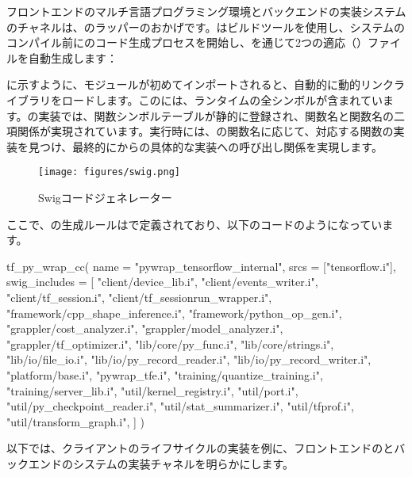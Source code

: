 \begin{content}

フロントエンドのマルチ言語プログラミング環境とバックエンドの\cpp{}実装システムのチャネルは、のラッパーのおかげです。はビルドツールを使用し、システムのコンパイル前にのコード生成プロセスを開始し、を通じて2つの適応（）ファイルを自動生成します：

\begin{enum}
\end{enum}

に示すように、モジュールが初めてインポートされると、自動的に動的リンクライブラリをロードします。このには、\tf{}ランタイムの全シンボルが含まれています。の実装では、関数シンボルテーブルが静的に登録され、関数名と関数名の二項関係が実現されています。実行時には、の関数名に応じて、対応する関数の実装を見つけ、最終的にからの具体的な実装への呼び出し関係を実現します。

\begin{figure}[H]
\centering
\texttt{[image: figures/swig.png]}
\caption{Swigコードジェネレーター}
 \label{fig:swig}
\end{figure}

ここで、の生成ルールはで定義されており、以下のコードのようになっています。

\begin{leftbar}
\begin{python}
tf_py_wrap_cc(
    name = "pywrap_tensorflow_internal",
    srcs = ["tensorflow.i"],
    swig_includes = [
        "client/device_lib.i",
        "client/events_writer.i",
        "client/tf_session.i",
        "client/tf_sessionrun_wrapper.i",
        "framework/cpp_shape_inference.i",
        "framework/python_op_gen.i",
        "grappler/cost_analyzer.i",
        "grappler/model_analyzer.i",
        "grappler/tf_optimizer.i",
        "lib/core/py_func.i",
        "lib/core/strings.i",
        "lib/io/file_io.i",
        "lib/io/py_record_reader.i",
        "lib/io/py_record_writer.i",
        "platform/base.i",
        "pywrap_tfe.i",
        "training/quantize_training.i",
        "training/server_lib.i",
        "util/kernel_registry.i",
        "util/port.i",
        "util/py_checkpoint_reader.i",
        "util/stat_summarizer.i",
        "util/tfprof.i",
        "util/transform_graph.i",
    ]
)
\end{python}
\end{leftbar}

以下では、クライアントのライフサイクルの実装を例に、フロントエンドのとバックエンドの\cpp{}システムの実装チャネルを明らかにします。

\end{content}


